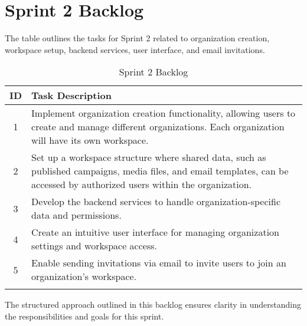 \section{Sprint 2 Backlog}
The table outlines the tasks for Sprint 2 related to organization creation, workspace setup, backend services, user interface, and email invitations.
\begin{longtable}{|c|p{}|}
	\hline
	\textbf{ID} & \textbf{Task Description}                                                                                                                                                   \\
	\hline
	1           & Implement organization creation functionality, allowing users to create and manage different organizations. Each organization will have its own workspace.                  \\
	\hline
	2           & Set up a workspace structure where shared data, such as published campaigns, media files, and email templates, can be accessed by authorized users within the organization. \\
	\hline
	3           & Develop the backend services to handle organization-specific data and permissions.                                                                                          \\
	\hline
	4           & Create an intuitive user interface for managing organization settings and workspace access.                                                                                 \\
	\hline
	5           & Enable sending invitations via email to invite users to join an organization's workspace.                                                                                   \\
	\hline
	\caption{Sprint 2 Backlog}
	\label{tab:Sprint2Backlog}
\end{longtable}

The structured approach outlined in this backlog ensures clarity in understanding the responsibilities and goals for this sprint.